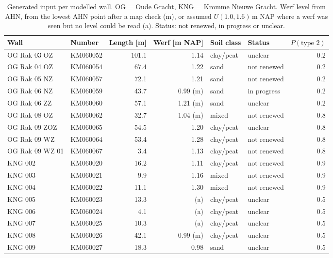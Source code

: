 \begin{table}[htbp]
\centering
\small
\caption{Generated input per modelled wall. OG = Oude Gracht, KNG = Kromme
Nieuwe Gracht. Werf level from AHN, from the lowest AHN point after a map
check (m), or assumed $U(1.0, 1.6)$\,m NAP where a werf was seen but no level
could be read (a). Status: not renewed, in progress or unclear.}
\label{tab:wall-inputs}
\begin{tabular}{@{}l l r r l l r@{}}
\toprule
Wall & Number & Length [m] & Werf [m NAP] & Soil class & Status & $P(\text{type 2})$ \\
\midrule
OG Rak 03 OZ  & KM060052 & 101.1 & 1.14     & clay/peat & unclear     & 0.2 \\
OG Rak 04 OZ  & KM060054 &  67.4 & 1.22     & sand      & not renewed & 0.2 \\
OG Rak 05 NZ  & KM060057 &  72.1 & 1.21     & sand      & not renewed & 0.2 \\
OG Rak 06 NZ  & KM060059 &  43.7 & 0.99 (m) & sand      & in progress & 0.2 \\
OG Rak 06 ZZ  & KM060060 &  57.1 & 1.21 (m) & sand      & unclear     & 0.2 \\
OG Rak 08 OZ  & KM060062 &  32.7 & 1.04 (m) & mixed     & not renewed & 0.8 \\
OG Rak 09 ZOZ & KM060065 &  54.5 & 1.20     & clay/peat & unclear     & 0.8 \\
OG Rak 09 WZ  & KM060064 &  53.4 & 1.28     & clay/peat & not renewed & 0.8 \\
OG Rak 09 WZ 01 & KM060067 & 3.4 & 1.13     & clay/peat & not renewed & 0.8 \\
KNG 002       & KM060020 &  16.2 & 1.11     & clay/peat & not renewed & 0.9 \\
KNG 003       & KM060021 &   9.9 & 1.16     & mixed     & not renewed & 0.9 \\
KNG 004       & KM060022 &  11.1 & 1.30     & mixed     & not renewed & 0.9 \\
KNG 005       & KM060023 &  13.3 & (a)      & clay/peat & unclear     & 0.5 \\
KNG 006       & KM060024 &   4.1 & (a)      & clay/peat & unclear     & 0.5 \\
KNG 007       & KM060025 &  10.3 & (a)      & clay/peat & unclear     & 0.5 \\
KNG 008       & KM060026 &  42.1 & 0.99 (m) & clay/peat & unclear     & 0.5 \\
KNG 009       & KM060027 &  18.3 & 0.98     & sand      & unclear     & 0.5 \\
\bottomrule
\end{tabular}
\end{table}

